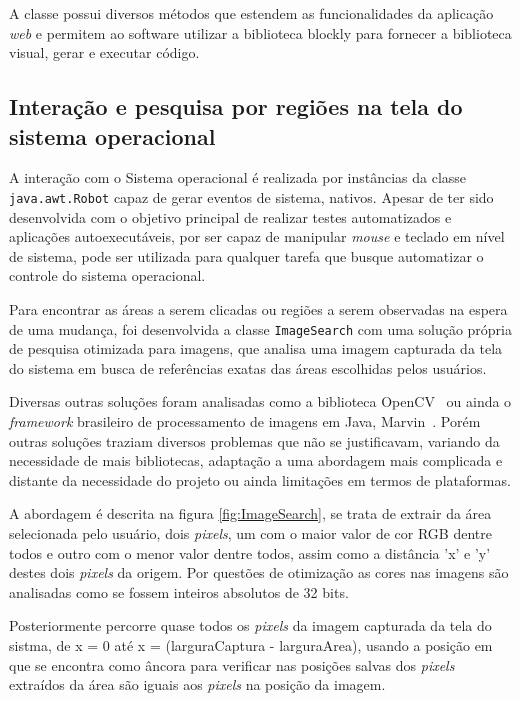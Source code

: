 \documentclass[tg]{mdtufsm}
\begin{document}
                A classe possui diversos métodos que estendem as funcionalidades da aplicação \emph{web} e permitem ao software utilizar a biblioteca blockly para fornecer a biblioteca visual, gerar e executar código.

                \subsection {Interação e pesquisa por regiões na tela do sistema operacional}

                A interação com o Sistema operacional é realizada por instâncias da classe \texttt{java.awt.Robot} capaz de gerar eventos de sistema, nativos. Apesar de ter sido desenvolvida com o objetivo principal de realizar testes automatizados e aplicações autoexecutáveis, por ser capaz de manipular \emph{mouse} e teclado em nível de sistema, pode ser utilizada para qualquer tarefa que busque automatizar o controle do sistema operacional.

                Para encontrar as áreas a serem clicadas ou regiões a serem observadas na espera de uma mudança, foi desenvolvida a classe \texttt{ImageSearch} com uma solução própria de pesquisa otimizada para imagens, que analisa uma imagem capturada da tela do sistema em busca de referências exatas das áreas escolhidas pelos usuários.

                Diversas outras soluções foram analisadas como a biblioteca OpenCV~\cite{openCV} ou ainda o \emph{framework} brasileiro de processamento de imagens em Java, Marvin~\cite{marvin}. Porém outras soluções traziam diversos problemas que não se justificavam, variando da necessidade de mais bibliotecas, adaptação a uma abordagem mais complicada e distante da necessidade do projeto ou ainda limitações em termos de plataformas.

                A abordagem é descrita na figura \ref{fig:ImageSearch}, se trata de extrair da área selecionada pelo usuário, dois \emph{pixels}, um com o maior valor de cor RGB dentre todos e outro com o menor valor dentre todos, assim como a distância 'x' e 'y' destes dois \emph{pixels} da origem. Por questões de otimização as cores nas imagens são analisadas como se fossem inteiros absolutos de 32 bits.

                Posteriormente percorre quase todos os \emph{pixels} da imagem capturada da tela do sistma, de x = 0 até x = (larguraCaptura - larguraArea), usando a posição em que se encontra como âncora para verificar nas posições salvas dos \emph{pixels} extraídos da área são iguais aos \emph{pixels} na posição da imagem.
\end{document}
